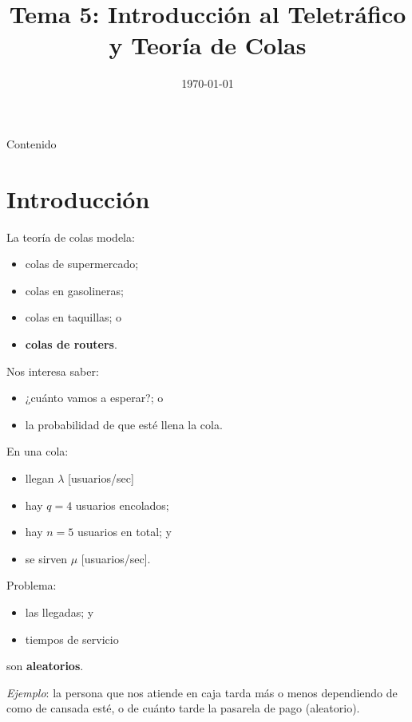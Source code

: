\documentclass[xcolor={x11names}]{beamer}
\title[Tema 5]{Tema 5: Introducción al Teletráfico y Teoría de Colas}
\institute{
    \inst{1}
    Departamento de Ingeniería Telemática, Universidad Politécnica de Madrid
}
\date{\today}
\begin{document}
\frame{\titlepage }


\begin{frame}{Contenido}
    \tableofcontents
\end{frame}




\section{Introducción}
\begin{frame}{\secname}
    La teoría de colas modela:
    \begin{itemize}
        \item colas de supermercado;
        \item colas en gasolineras;
        \item colas en taquillas; o
        \item \textbf{colas de routers}.
    \end{itemize}

    \vfill
    Nos interesa saber:
    \begin{itemize}
        \item ¿cuánto vamos a esperar?; o
        \item la probabilidad de que esté llena la cola.
    \end{itemize}
\end{frame}



\begin{frame}{\secname}
    \begin{figure}
        
    \end{figure}

    En una cola:
    \begin{itemize}
        \item llegan $\lambda$ [usuarios/sec]
        \item hay $q=4$ usuarios encolados;
        \item hay $n=5$ usuarios en total; y
        \item se sirven $\mu$ [usuarios/sec].
    \end{itemize}
\end{frame}


\begin{frame}{\secname}
    Problema:
    \begin{itemize}
        \item las llegadas; y
        \item tiempos de servicio
    \end{itemize}
    son \textbf{aleatorios}.

    \vfill

    \textit{Ejemplo}: la persona que nos
    atiende en caja tarda más o menos
    dependiendo de como de cansada esté,
    o de cuánto tarde la pasarela de pago
    (aleatorio).
\end{frame}
\end{document}
